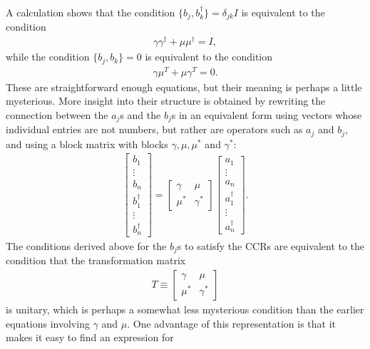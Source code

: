 \documentclass[12pt]{article}
\begin{document}
{A calculation shows that the condition $\{ b_j, b_k^\dagger \} =
\delta_{jk} I$ is equivalent to the condition
\begin{eqnarray}
  \gamma \gamma^\dagger + \mu \mu^\dagger = I,
\end{eqnarray}
while the condition $\{ b_j, b_k \} = 0$ is equivalent to the condition
\begin{eqnarray}
  \gamma \mu^T+\mu \gamma^T = 0.
\end{eqnarray}
These are straightforward enough equations, but their meaning is
perhaps a little mysterious.  More insight into their structure is
obtained by rewriting the connection between the $a_j$s and the $b_j$s
in an equivalent form using vectors whose individual entries are not
numbers, but rather are operators such as $a_j$ and $b_j$, and using a
block matrix with blocks $\gamma, \mu, \mu^*$ and $\gamma^*$:
\begin{eqnarray}
  \left[ \begin{array}{c} b_1 \\ \vdots \\ b_n \\
    b_1^\dagger \\ \vdots \\ b_n^\dagger \end{array} \right]
  = \left[ \begin{array}{cc} \gamma & \mu \\ \mu^* & \gamma^*
      \end{array} \right] 
  \left[ \begin{array}{c} a_1 \\ \vdots \\ a_n \\
    a_1^\dagger \\ \vdots \\ a_n^\dagger \end{array} \right].
\end{eqnarray}
The conditions derived above for the $b_j$s to satisfy the CCRs are
equivalent to the condition that the transformation matrix
\begin{eqnarray}
  T \equiv \left[ \begin{array}{cc} \gamma & \mu \\ \mu^* & \gamma^*
      \end{array} \right]
\end{eqnarray}
is unitary, which is perhaps a somewhat less mysterious condition than
the earlier equations involving $\gamma$ and $\mu$.  One advantage of
this representation is that it makes it easy to find an expression for
}
\end{document}
